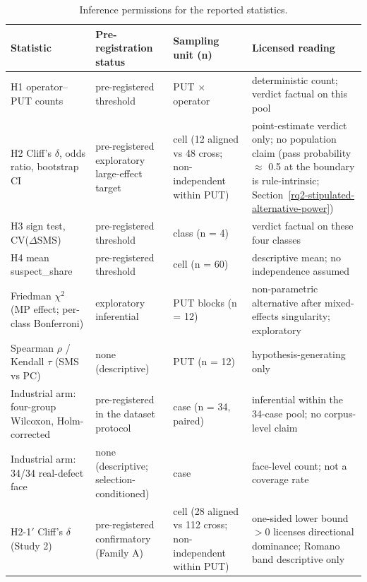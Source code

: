 \documentclass[manuscript,screen,review]{acmart}
\begin{document}
{%
\begin{longtable}[]{@{}
  >{\raggedright\arraybackslash}p{}
  >{\raggedright\arraybackslash}p{}
  >{\raggedright\arraybackslash}p{}
  >{\raggedright\arraybackslash}p{}@{}}
\caption{Inference permissions for the reported statistics.}\label{tab:inference-permissions}\\
\toprule\noalign{}
Statistic & Pre-registration status & Sampling unit (n) & Licensed reading \\
\midrule\noalign{}
\endfirsthead
\endhead
\bottomrule\noalign{}
\endlastfoot
H1 operator--PUT counts & pre-registered threshold & PUT $\times$
operator & deterministic count; verdict factual on this pool \\
H2 Cliff's $\delta$, odds ratio, bootstrap CI & pre-registered
exploratory large-effect target & cell (12 aligned vs 48 cross;
non-independent within PUT) & point-estimate verdict only; no
population claim (pass probability $\approx$ 0.5 at the boundary is
rule-intrinsic; Section~\ref{rq2-stipulated-alternative-power}) \\
H3 sign test, CV($\Delta$SMS) & pre-registered threshold & class (n = 4)
& verdict factual on these four classes \\
H4 mean suspect\_share & pre-registered threshold & cell (n = 60) &
descriptive mean; no independence assumed \\
Friedman $\chi^2$ (MP effect; per-class Bonferroni) & exploratory
inferential & PUT blocks (n = 12) & non-parametric alternative after
mixed-effects singularity; exploratory \\
Spearman $\rho$ / Kendall $\tau$ (SMS vs PC) & none (descriptive) & PUT
(n = 12) & hypothesis-generating only \\
Industrial arm: four-group Wilcoxon, Holm-corrected & pre-registered in
the dataset protocol & case (n = 34, paired) & inferential within the
34-case pool; no corpus-level claim \\
Industrial arm: 34/34 real-defect face & none (descriptive; selection-conditioned) & case &
face-level count; not a coverage rate \\
H2-1\('\) Cliff's $\delta$ (Study 2) & pre-registered confirmatory (Family A) &
cell (28 aligned vs 112 cross; non-independent within PUT) & one-sided
lower bound $>0$ licenses directional dominance; Romano band descriptive
only \\

\end{longtable}}
\end{document}
